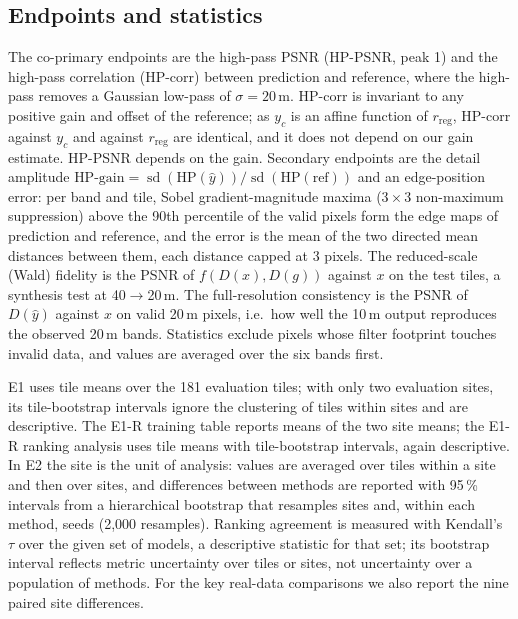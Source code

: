 \documentclass[pdflatex,sn-basic,referee,lineno]{sn-jnl}
\newcommand{\rreg}{r_{\mathrm{reg}}}
\newcommand{\HP}{\mathrm{HP}}
\begin{document}
\subsection{Endpoints and statistics}\label{sec:endpoints}

The co-primary endpoints are the high-pass PSNR (HP-PSNR, peak 1) and the high-pass correlation (HP-corr) between
prediction and reference, where the high-pass removes a Gaussian low-pass of $\sigma=20$\,m. HP-corr is invariant to
any positive gain and offset of the reference; as $y_c$ is an affine function of $\rreg$, HP-corr against $y_c$ and
against $\rreg$ are identical, and it does not depend on our gain estimate. HP-PSNR depends on the gain. Secondary
endpoints are the detail amplitude $\text{HP-gain}=\operatorname{sd}(\HP(\hat y))/\operatorname{sd}(\HP(\text{ref}))$
and an edge-position error: per band and tile, Sobel gradient-magnitude maxima ($3\times3$ non-maximum suppression)
above the 90th percentile of the valid pixels form the edge maps of prediction and reference, and the error is the
mean of the two directed mean distances between them, each distance capped at 3 pixels. The reduced-scale (Wald)
fidelity is the PSNR of $f(D(x),D(g))$ against $x$ on the test tiles, a synthesis test at 40$\to$20\,m. The
full-resolution consistency is the PSNR of $D(\hat y)$ against $x$ on valid 20\,m pixels, i.e.\ how well the
10\,m output reproduces the observed 20\,m bands. Statistics
exclude pixels whose filter footprint touches invalid data, and values are averaged over the six bands first.

E1 uses tile means over the 181 evaluation tiles; with only two evaluation sites, its tile-bootstrap intervals
ignore the clustering of tiles within sites and are descriptive. The E1-R training table reports means of the two
site means; the E1-R ranking analysis uses tile means with tile-bootstrap intervals, again descriptive. In E2 the site is the unit of analysis:
values are averaged over tiles within a site and then over sites, and differences between methods are reported with
95\,\% intervals from a hierarchical bootstrap that resamples sites and, within each method, seeds (2,000
resamples). Ranking agreement is measured with Kendall's $\tau$ over the given set of models, a descriptive statistic for that
set; its bootstrap interval reflects metric uncertainty over tiles or sites, not uncertainty over a population of
methods. For the key real-data comparisons we also report the nine paired site differences.
\end{document}
